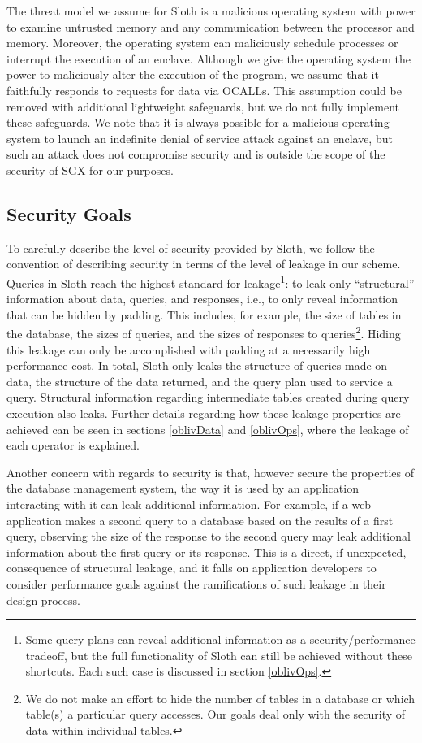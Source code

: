 \documentclass[USenglish,oneside,twocolumn]{article}
\def\name/{Sloth}
\begin{document}
The threat model we assume for \name/ is a malicious operating system with power to examine untrusted memory and any communication between the processor and memory. Moreover, the operating system can maliciously schedule processes or interrupt the execution of an enclave. Although we give the operating system the power to maliciously alter the execution of the program, we assume that it faithfully responds to requests for data via OCALLs. This assumption could be removed with additional lightweight safeguards, but we do not fully implement these safeguards. We note that it is always possible for a malicious operating system to launch an indefinite denial of service attack against an enclave, but such an attack does not compromise security and is outside the scope of the security of SGX for our purposes. 
 
\subsection{Security Goals}
To carefully describe the level of security provided by \name/, we follow the convention \cite{FVY+17} of describing security in terms of the level of leakage in our scheme. Queries in \name/ reach the highest standard for leakage\footnote{Some query plans can reveal additional information as a security/performance tradeoff, but the full functionality of \name/ can still be achieved without these shortcuts. Each such case is discussed in section \ref{oblivOps}.}: to leak only ``structural'' information about data, queries, and responses, i.e., to only reveal information that can be hidden by padding. This includes, for example, the size of tables in the database, the sizes of queries, and the sizes of responses to queries\footnote{We do not make an effort to hide the number of tables in a database or which table(s) a particular query accesses. Our goals deal only with the security of data within individual tables.}. Hiding this leakage can only be accomplished with padding at a necessarily high performance cost. In total, \name/ only leaks the structure of queries made on data, the structure of the data returned, and the query plan used to service a query. Structural information regarding intermediate tables created during query execution also leaks. Further details regarding how these leakage properties are achieved can be seen in sections \ref{oblivData} and \ref{oblivOps}, where the leakage of each operator is explained. 

Another concern with regards to security is that, however secure the properties of the database management system, the way it is used by an application interacting with it can leak additional information. For example, if a web application makes a second query to a database based on the results of a first query, observing the size of the response to the second query may leak additional information about the first query or its response. This is a direct, if unexpected, consequence of structural leakage, and it falls on application developers to consider performance goals against the ramifications of such leakage in their design process. 
\end{document}
